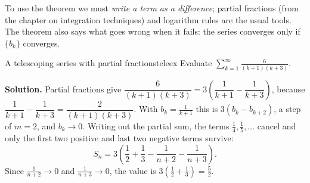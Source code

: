 \documentclass[11pt]{article}
\begin{document}
To use the theorem we must \emph{write a term as a difference}; partial fractions (from the chapter on integration techniques) and logarithm rules are the usual tools. The theorem also says what goes wrong when it fails: the series converges only if $\{b_k\}$ converges.

\begin{exmp}{A telescoping series with partial fractions}{teleex}
Evaluate $\displaystyle\sum_{k=1}^\infty\frac6{(k+1)(k+3)}$.

\textbf{Solution.} Partial fractions give $\dfrac6{(k+1)(k+3)}=3\left(\dfrac1{k+1}-\dfrac1{k+3}\right)$, because $\dfrac1{k+1}-\dfrac1{k+3}=\dfrac2{(k+1)(k+3)}$.
With $b_k=\frac1{k+1}$ this is $3(b_k-b_{k+2})$, a step of $m=2$, and $b_k\to0$. Writing out the partial sum, the terms $\frac14,\frac15,\dots$ cancel and only the first two positive and last two negative terms survive:
\[
S_n=3\left(\frac12+\frac13-\frac1{n+2}-\frac1{n+3}\right).
\]
Since $\frac1{n+2}\to0$ and $\frac1{n+3}\to0$, the value is $3\left(\frac12+\frac13\right)=\frac52$.
\end{exmp}
\end{document}
